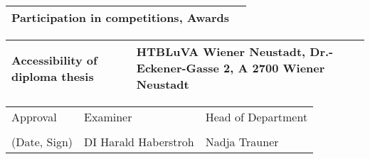 \begin{center}
    \vspace{5mm}
    
    \begin{tabular}{| m{8cm} | m{8cm} |}
        \hline
        Participation in competitions, Awards & \\ 
        \hline
    \end{tabular}
    
    \vspace{5mm}
    
    \begin{tabular}{| m{8cm} | m{8cm} |}
        \hline
        Accessibility of diploma thesis & HTBLuVA Wiener Neustadt, Dr.-Eckener-Gasse 2, A 2700 Wiener Neustadt\\ 
        \hline
    \end{tabular}
    
    \vspace{5mm}
    
    \begin{tabular}{| m{5cm} | m{6cm} | m{5cm} |}
        \hline
        Approval & Examiner & Head of Department\\
        &&\\
        (Date, Sign) & DI Harald Haberstroh & Nadja Trauner\\ %
        \hline
    \end{tabular}
    
    \end{center}
